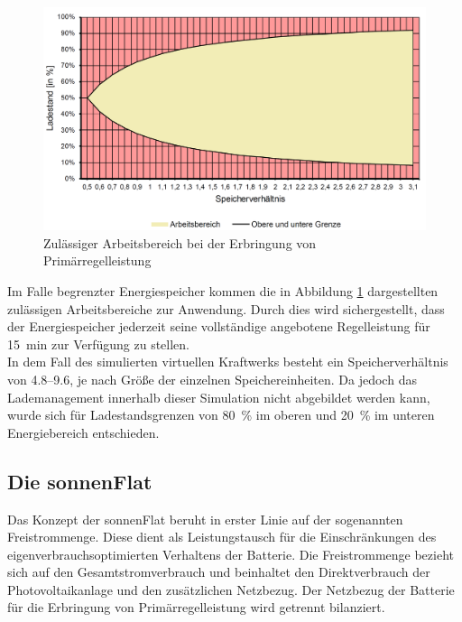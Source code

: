 \begin{figure}[H]
	\begin{center}
		\includegraphics[width=\textwidth]{Bilder/P-E_factor.png}
		\caption{Zulässiger Arbeitsbereich bei der Erbringung von Primärregelleistung \parencite[s. S. 61][]{regel_PQ19}}
		\label{fig:P_E_factor}
	\end{center}
\end{figure}

\noindent Im Falle begrenzter Energiespeicher kommen die in Abbildung \ref{fig:P_E_factor} dargestellten zulässigen Arbeitsbereiche zur Anwendung. Durch dies wird sichergestellt, dass der Energiespeicher jederzeit seine vollständige angebotene Regelleistung für \SI{15}{\minute} zur Verfügung zu stellen.\medskip\\
In dem Fall des simulierten virtuellen Kraftwerks besteht ein Speicherverhältnis von \SIrange{4.8}{9.6}{}, je nach Größe der einzelnen Speichereinheiten. Da jedoch das Lademanagement innerhalb dieser Simulation nicht abgebildet werden kann, wurde sich für Ladestandsgrenzen von \SI{80}{\percent} im oberen und \SI{20}{\percent} im unteren Energiebereich entschieden.

\subsection{Die sonnenFlat}

Das Konzept der sonnenFlat beruht in erster Linie auf der sogenannten Freistrommenge. Diese dient als Leistungstausch für die Einschränkungen des eigenverbrauchsoptimierten Verhaltens der Batterie. Die Freistrommenge bezieht sich auf den Gesamtstromverbrauch und beinhaltet den Direktverbrauch der Photovoltaikanlage und den zusätzlichen Netzbezug. Der Netzbezug der Batterie für die Erbringung von Primärregelleistung wird getrennt bilanziert.

